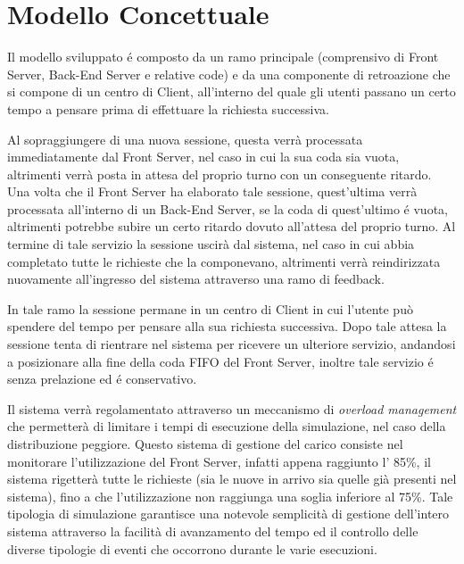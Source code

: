 
\chapter{Modello Concettuale}
 	\label{cap:modello concettuale}

Il modello sviluppato \'e composto da un ramo principale (comprensivo di Front 
Server, Back-End Server e relative code) e da una componente di retroazione che 
si compone di un centro di Client, all'interno del quale gli utenti passano un 
certo tempo a pensare prima di effettuare la richiesta
successiva.

Al sopraggiungere di una nuova sessione, questa verr\`a processata 
immediatamente dal Front Server, nel caso in cui la sua coda sia vuota, 
altrimenti verr\`a posta in attesa del proprio turno con un conseguente ritardo. 
Una volta che il Front Server ha elaborato tale sessione, quest'ultima verr\`a 
processata all'interno di un Back-End Server, se la coda di quest'ultimo \'e 
vuota, altrimenti potrebbe subire un certo ritardo dovuto all'attesa del 
proprio turno. Al termine di tale servizio la sessione uscir\`a dal sistema, nel 
caso in cui abbia completato tutte le richieste che la componevano, altrimenti 
verr\`a reindirizzata nuovamente all'ingresso del sistema attraverso una ramo di 
feedback.

In tale ramo la sessione permane in un centro di Client in cui l'utente pu\`o 
spendere del tempo per pensare alla sua richiesta successiva. Dopo tale attesa 
la sessione tenta di rientrare nel sistema per ricevere un ulteriore servizio, 
andandosi a posizionare alla fine della coda FIFO del Front Server, inoltre tale 
servizio \'e senza prelazione ed \'e conservativo.

Il sistema verr\`a regolamentato attraverso un meccanismo di \textit{overload 
management} che permetter\`a di limitare i tempi di esecuzione della 
simulazione, nel caso della distribuzione peggiore. Questo sistema di gestione del carico 
consiste nel monitorare l'utilizzazione del Front Server, infatti appena 
raggiunto l' 85\%, il sistema rigetter\`a tutte le richieste (sia le nuove in arrivo 
sia quelle gi\`a presenti nel sistema), fino a che l'utilizzazione non raggiunga una soglia inferiore al 75\%. 
Tale tipologia di simulazione garantisce una notevole semplicit\`a di gestione 
dell'intero sistema attraverso la facilit\`a di avanzamento del tempo ed il 
controllo delle diverse tipologie di eventi che occorrono durante le varie 
esecuzioni.

